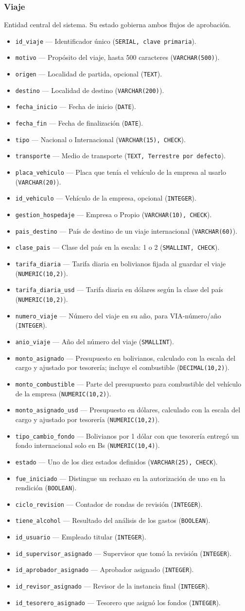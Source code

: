 \documentclass[11pt,letterpaper]{article}
\newcommand{\code}[1]{\nolinkurl{#1}}
\newcommand{\campo}[3]{\item \code{#1} --- #2 (\texttt{#3}).}
\begin{document}
\subsubsection{Viaje}
Entidad central del sistema. Su estado gobierna ambos flujos de aprobación.
\begin{itemize}
  \campo{id_viaje}{Identificador único}{SERIAL, clave primaria}
  \campo{motivo}{Propósito del viaje, hasta 500 caracteres}{VARCHAR(500)}
  \campo{origen}{Localidad de partida, opcional}{TEXT}
  \campo{destino}{Localidad de destino}{VARCHAR(200)}
  \campo{fecha_inicio}{Fecha de inicio}{DATE}
  \campo{fecha_fin}{Fecha de finalización}{DATE}
  \campo{tipo}{Nacional o Internacional}{VARCHAR(15), CHECK}
  \campo{transporte}{Medio de transporte}{TEXT, Terrestre por defecto}
  \campo{placa_vehiculo}{Placa que tenía el vehículo de la empresa al usarlo}{VARCHAR(20)}
  \campo{id_vehiculo}{Vehículo de la empresa, opcional}{INTEGER}
  \campo{gestion_hospedaje}{Empresa o Propio}{VARCHAR(10), CHECK}
  \campo{pais_destino}{País de destino de un viaje internacional}{VARCHAR(60)}
  \campo{clase_pais}{Clase del país en la escala: 1 o 2}{SMALLINT, CHECK}
  \campo{tarifa_diaria}{Tarifa diaria en bolivianos fijada al guardar el viaje}{NUMERIC(10,2)}
  \campo{tarifa_diaria_usd}{Tarifa diaria en dólares según la clase del país}{NUMERIC(10,2)}
  \campo{numero_viaje}{Número del viaje en su año, para VIA-número/año}{INTEGER}
  \campo{anio_viaje}{Año del número del viaje}{SMALLINT}
  \campo{monto_asignado}{Presupuesto en bolivianos, calculado con la escala del cargo y ajustado por tesorería; incluye el combustible}{DECIMAL(10,2)}
  \campo{monto_combustible}{Parte del presupuesto para combustible del vehículo de la empresa}{NUMERIC(10,2)}
  \campo{monto_asignado_usd}{Presupuesto en dólares, calculado con la escala del cargo y ajustado por tesorería}{NUMERIC(10,2)}
  \campo{tipo_cambio_fondo}{Bolivianos por 1 dólar con que tesorería entregó un fondo internacional solo en Bs}{NUMERIC(10,4)}
  \campo{estado}{Uno de los diez estados definidos}{VARCHAR(25), CHECK}
  \campo{fue_iniciado}{Distingue un rechazo en la autorización de uno en la rendición}{BOOLEAN}
  \campo{ciclo_revision}{Contador de rondas de revisión}{INTEGER}
  \campo{tiene_alcohol}{Resultado del análisis de los gastos}{BOOLEAN}
  \campo{id_usuario}{Empleado titular}{INTEGER}
  \campo{id_supervisor_asignado}{Supervisor que tomó la revisión}{INTEGER}
  \campo{id_aprobador_asignado}{Aprobador asignado}{INTEGER}
  \campo{id_revisor_asignado}{Revisor de la instancia final}{INTEGER}
  \campo{id_tesorero_asignado}{Tesorero que asignó los fondos}{INTEGER}
\end{itemize}
\end{document}
